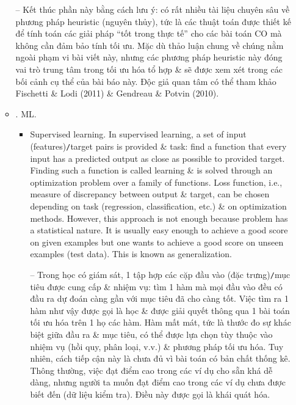 \documentclass{article}
\begin{document}
\begin{itemize}
\begin{itemize}
        -- Kết thúc phần này bằng cách lưu ý: có rất nhiều tài liệu chuyên sâu về phương pháp heuristic (nguyên thủy), tức là các thuật toán được thiết kế để tính toán các giải pháp ``tốt trong thực tế'' cho các bài toán CO mà không cần đảm bảo tính tối ưu. Mặc dù thảo luận chung về chúng nằm ngoài phạm vi bài viết này, nhưng các phương pháp heuristic này đóng vai trò trung tâm trong tối ưu hóa tổ hợp \& sẽ được xem xét trong các bối cảnh cụ thể của bài báo này. Độc giả quan tâm có thể tham khảo Fischetti \& Lodi (2011) \& Gendreau \& Potvin (2010).
        \item {. ML.}
        \begin{itemize}
            \item {\sf Supervised learning.} In supervised learning, a set of input (features){\tt/}target pairs is provided \& task: find a function that every input has a predicted output as close as possible to provided target. Finding such a function is called learning \& is solved through an optimization problem over a family of functions. Loss function, i.e., measure of discrepancy between output \& target, can be chosen depending on task (regression, classification, etc.) \& on optimization methods. However, this approach is not enough because problem has a statistical nature. It is usually easy enough to achieve a good score on given examples but one wants to achieve a good score on unseen examples (test data). This is known as generalization.

            -- Trong học có giám sát, 1 tập hợp các cặp đầu vào (đặc trưng){\tt/}mục tiêu được cung cấp \& nhiệm vụ: tìm 1 hàm mà mọi đầu vào đều có đầu ra dự đoán càng gần với mục tiêu đã cho càng tốt. Việc tìm ra 1 hàm như vậy được gọi là học \& được giải quyết thông qua 1 bài toán tối ưu hóa trên 1 họ các hàm. Hàm mất mát, tức là thước đo sự khác biệt giữa đầu ra \& mục tiêu, có thể được lựa chọn tùy thuộc vào nhiệm vụ (hồi quy, phân loại, v.v.) \& phương pháp tối ưu hóa. Tuy nhiên, cách tiếp cận này là chưa đủ vì bài toán có bản chất thống kê. Thông thường, việc đạt điểm cao trong các ví dụ cho sẵn khá dễ dàng, nhưng người ta muốn đạt điểm cao trong các ví dụ chưa được biết đến (dữ liệu kiểm tra). Điều này được gọi là khái quát hóa.


\end{itemize}
\end{itemize}
\end{itemize}
\end{document}
